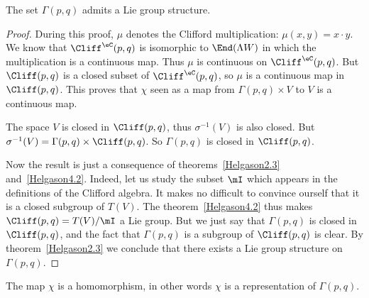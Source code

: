 \begin{proposition}
	The set $\Gamma(p,q)$ admits a Lie group structure.
\end{proposition}
\begin{proof}

	During this proof, $\mu$ denotes the Clifford multiplication: $\mu(x,y)=x\cdot y$. We know that $\Cliff^{\eC}(p,q)$ is isomorphic to $\End(\Lambda W)$ in which the multiplication is a continuous map. Thus $\mu$ is continuous on $\Cliff^{\eC}(p,q)$. But $\Cliff(p,q)$ is a closed subset of $\Cliff^{\eC}(p,q)$, so $\mu$ is a continuous map in $\Cliff(p,q)$. This proves that  $\chi$ seen as a map from $\Gamma(p,q)\times V$ to $V$ is a continuous map.

	The space $V$ is closed in $\Cliff(p,q)$, thus $\sigma^{-1}(V)$ is also closed. But $\sigma^{-1}(V)=\Gamma(p,q)\times\Cliff(p,q)$. So $\Gamma(p,q)$ is closed in $\Cliff(p,q)$.

	Now the result is just a consequence of theorems~\ref{Helgason2.3} and~\ref{Helgason4.2}. Indeed, let us study the subset $\mI$ which appears in the definitions of the Clifford algebra. It makes no difficult to convince ourself that it is a closed subgroup of $T(V)$. The theorem~\ref{Helgason4.2} thus makes $\Cliff(p,q)=T(V)/\mI$ a Lie group. But we just say that $\Gamma(p,q)$ is closed in $\Cliff(p,q)$, and the fact that $\Gamma(p,q)$ is a subgroup of $\Cliff(p,q)$ is clear. By theorem~\ref{Helgason2.3} we conclude that there exists a Lie group structure on $\Gamma(p,q)$.
\end{proof}

\begin{lemma}
	The map $\chi$ is a homomorphism, in other words $\chi$ is a representation of $\Gamma(p,q)$.
\end{lemma}

